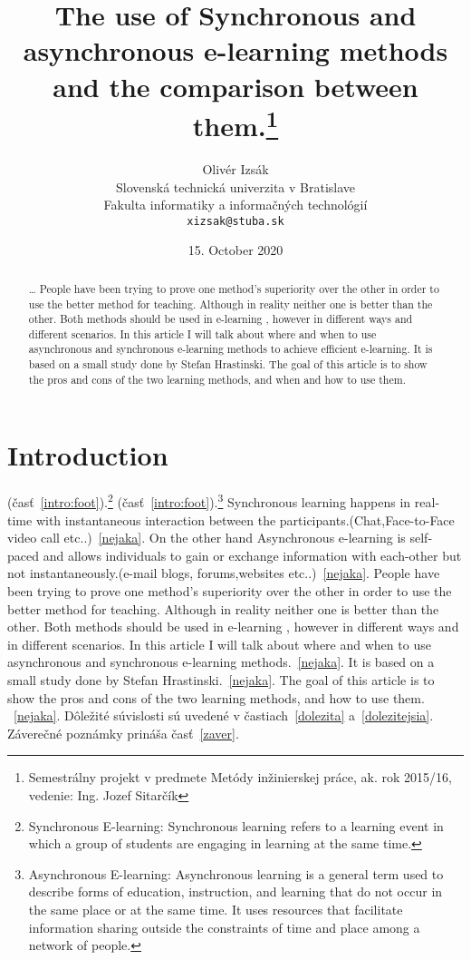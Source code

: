 \documentclass[10pt,twoside,english,a4paper]{article}
\title{The use of Synchronous and asynchronous e-learning methods and the comparison between them.\thanks{Semestrálny projekt v predmete Metódy inžinierskej práce, ak. rok 2015/16, vedenie: 	
Ing. Jozef Sitarčík}} %
\author{Olivér Izsák\\[2pt]
	{\small Slovenská technická univerzita v Bratislave}\\
	{\small Fakulta informatiky a informačných technológií}\\
	{\small \texttt{xizsak@stuba.sk}}
	}
\date{\small 15. October 2020}
\begin{document}
\maketitle

\begin{abstract}
\ldots
People have been trying to prove one method's superiority over the other in order to use the better method for teaching.
Although in reality neither one is better than the other. Both methods should be used in e-learning , however
in different ways  and different scenarios. In this article I will talk about where and when to use asynchronous and
synchronous e-learning methods to achieve efficient e-learning. It is based on a small study done by Stefan Hrastinski.
The goal of this article is to show the pros and cons of the two learning methods, and when and how to use them.
\end{abstract}



\section{Introduction} \label{intro}
(časť~\ref{intro:foot}).\footnote{Synchronous E-learning: Synchronous learning refers to a learning event in which a group of students are engaging in learning at the same time.}
(časť~\ref{intro:foot}).\footnote{Asynchronous E-learning: Asynchronous learning is a general term used to describe forms of education, instruction, and learning that do not occur in the same place or at the same time. It uses resources that facilitate information sharing outside the constraints of time and place among a network of people.}
Synchronous learning happens in real-time with instantaneous interaction between the participants.(Chat,Face-to-Face video call  etc..)~\ref{nejaka}.
On the other hand Asynchronous e-learning 
is self-paced and allows individuals to gain or exchange information with each-other but not instantaneously.(e-mail
blogs, forums,websites etc..)~\ref{nejaka}.
People have been trying to prove one method's superiority over the other in order to use the better method for teaching.
Although in reality neither one is better than the other. Both methods should be used in e-learning , however
in different ways  and  in different scenarios. In this article I will talk about where and when to use asynchronous and
synchronous e-learning methods.~\ref{nejaka}. It is based on a small study done by Stefan Hrastinski.~\ref{nejaka}.
The goal of this article is to show the pros and cons of the two learning methods, and how to use them.
~\ref{nejaka}.
Dôležité súvislosti sú uvedené v častiach~\ref{dolezita} a~\ref{dolezitejsia}.
Záverečné poznámky prináša časť~\ref{zaver}.
\end{document}
